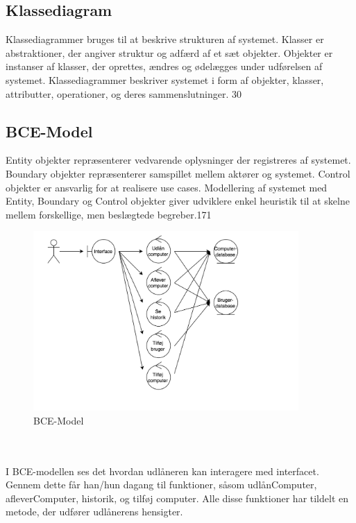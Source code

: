 \documentclass[a4paper]{article}
\begin{document}
\subsection{Klassediagram}
Klassediagrammer bruges til at beskrive strukturen af systemet. Klasser er abstraktioner, der angiver struktur og adfærd af et sæt objekter. Objekter er instanser af klasser, der oprettes, ændres og ødelægges under udførelsen af systemet. Klassediagrammer beskriver systemet i form af objekter, klasser, attributter, operationer, og deres sammenslutninger. \cite{OOSE}{30}
\subsection{BCE-Model}
Entity objekter repræsenterer vedvarende oplysninger der registreres af systemet. Boundary objekter repræsenterer samspillet mellem aktører og systemet. Control objekter er ansvarlig for at realisere use cases. Modellering af systemet med Entity, Boundary og Control objekter giver udviklere enkel heuristik til at skelne mellem forskellige, men beslægtede begreber.\cite{OOSE}{171}
\begin{figure}[h!]
\includegraphics[width=0.9\textwidth]{BCE.png}
  \caption{BCE-Model}
  \centering
\end{figure} \\ \\
I BCE-modellen ses det hvordan udlåneren kan interagere med interfacet. Gennem dette får han/hun dagang til funktioner, såsom udlånComputer, afleverComputer, historik, og tilføj computer. Alle disse funktioner har tildelt en metode, der udfører udlånerens hensigter.\\
\end{document}
